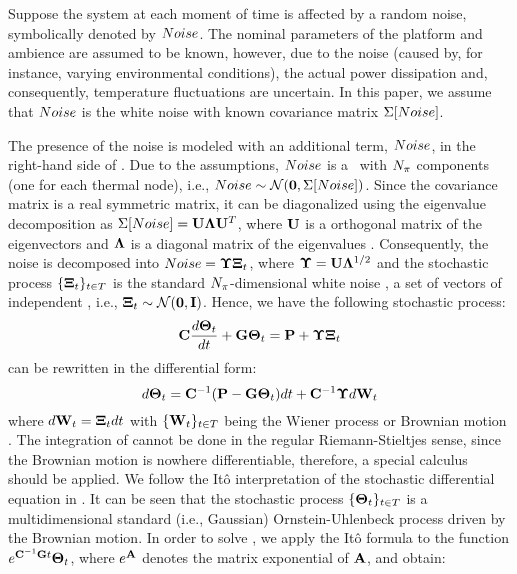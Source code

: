 Suppose the system at each moment of time is affected by a random noise, symbolically denoted by $Noise$. The nominal parameters of the platform and ambience are assumed to be known, however, due to the noise (caused by, for instance, varying environmental conditions), the actual power dissipation and, consequently, temperature fluctuations are uncertain. In this paper, we assume that $Noise$ is the white noise with known covariance matrix $\Sigma[Noise]$.

The presence of the noise is modeled with an additional term, $Noise$, in the right-hand side of . Due to the assumptions, $Noise$ is a \mnrv\ with $N_\pi$ components (one for each thermal node), i.e., $Noise \sim \mathcal{N}(\mathbf{0}, \Sigma[Noise])$. Since the covariance matrix is a real symmetric matrix, it can be diagonalized using the eigenvalue decomposition as $\Sigma[Noise] = \mathbf{U} \mathbf{\Lambda} \mathbf{U}^T$, where $\mathbf{U}$ is a orthogonal matrix of the eigenvectors and $\mathbf{\Lambda}$ is a diagonal matrix of the eigenvalues \cite{press2007}. Consequently, the noise is decomposed into $Noise = \mathbf{\Upsilon} \mathbf{\Xi}_t$, where $\mathbf{\Upsilon} = \mathbf{U} \mathbf{\Lambda}^{1/2}$ and the stochastic process $\{ \mathbf{\Xi}_t \}_{t \in T}$ is the standard $N_\pi$-dimensional white noise \cite{oksendal2003}, a set of vectors of independent \snrvs, i.e., $\mathbf{\Xi}_t \sim \mathcal{N}(\mathbf{0}, \mathbf{I})$. Hence, we have the following stochastic process:
\begin{equation} \equlabel{fourier-noise}
  \mcapacitance \frac{d\vtemperature_\time}{d\time} + \mconductance \vtemperature_\time = \vpower + \mnoisedeviation \vstdnormal_\time
\end{equation}
 can be rewritten in the differential form:
\begin{equation} \equlabel{fourier-wiener}
  d\vtemperature_\time = \mcapacitance^{-1} (\vpower - \mconductance \vtemperature_\time)d\time + \mcapacitance^{-1} \mnoisedeviation d\m{W}_\time
\end{equation}
where $d\mathbf{W}_t = \mathbf{\Xi}_t dt$ with $\{ \mathbf{W}_t \}_{t \in T}$ being the Wiener process or Brownian motion \cite{oksendal2003}. The integration of  cannot be done in the regular Riemann-Stieltjes sense, since the Brownian motion is nowhere differentiable, therefore, a special calculus should be applied. We follow the It\^{o} interpretation \cite{oksendal2003} of the stochastic differential equation in . It can be seen that the stochastic process $\{ \mathbf{\Theta}_t \}_{t \in T}$ is a multidimensional standard (i.e., Gaussian) Ornstein-Uhlenbeck process \cite{kloeden1992} driven by the Brownian motion. In order to solve , we apply the It\^{o} formula \cite{oksendal2003} to the function $e^{ \mathbf{C}^{-1} \mathbf{G} t} \mathbf{\Theta}_t$, where $e^{\mathbf{A}}$ denotes the matrix exponential of $\mathbf{A}$, and obtain:
